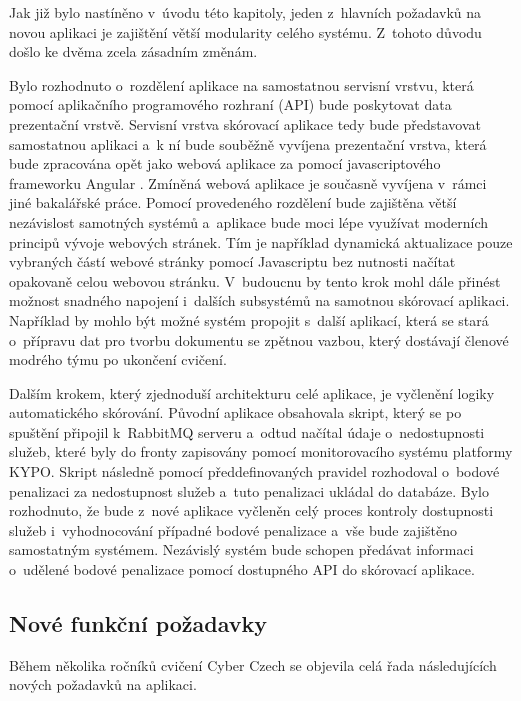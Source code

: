 \documentclass[
  digital,
  twoside,
  table, 
  nolof, 
  nolot
]{fithesis3}
\begin{document}
Jak již bylo nastíněno v~úvodu této kapitoly, jeden z~hlavních požadavků na novou aplikaci je zajištění větší modularity celého systému. Z~tohoto důvodu došlo ke dvěma zcela zásadním změnám.

Bylo rozhodnuto o~rozdělení aplikace na samostatnou servisní vrstvu, která pomocí aplikačního programového rozhraní (API) bude poskytovat data prezentační vrstvě. Servisní vrstva skórovací aplikace tedy bude představovat samostatnou aplikaci a~k ní bude souběžně vyvíjena prezentační vrstva, která bude zpracována opět jako webová aplikace za pomocí javascriptového frameworku Angular \cite{angular}. Zmíněná webová aplikace je současně vyvíjena v~rámci jiné bakalářské práce. Pomocí provedeného rozdělení bude zajištěna větší nezávislost samotných systémů a~aplikace bude moci lépe využívat moderních principů vývoje webových stránek. Tím je například dynamická aktualizace pouze vybraných částí webové stránky pomocí Javascriptu bez nutnosti načítat opakovaně celou webovou stránku. V~budoucnu by tento krok mohl dále přinést možnost  snadného napojení i~dalších subsystémů na samotnou skórovací aplikaci. Například by mohlo být možné systém propojit s~další aplikací, která se stará o~přípravu dat pro tvorbu dokumentu se zpětnou vazbou, který dostávají členové modrého týmu po ukončení cvičení.

Dalším krokem, který zjednoduší architekturu celé aplikace, je vyčlenění logiky automatického skórování. Původní aplikace obsahovala skript, který se po spuštění připojil k~RabbitMQ serveru a~odtud načítal údaje o~nedostupnosti služeb, které byly do fronty zapisovány pomocí monitorovacího systému platformy KYPO. Skript následně pomocí předdefinovaných pravidel rozhodoval o~bodové penalizaci za nedostupnost služeb a~tuto penalizaci ukládal do databáze. Bylo rozhodnuto, že bude z~nové aplikace vyčleněn celý proces kontroly dostupnosti služeb i~vyhodnocování případné bodové penalizace a~vše bude zajištěno samostatným systémem. Nezávislý systém bude schopen předávat informaci o~udělené bodové penalizace pomocí dostupného API do skórovací aplikace.

\subsection{Nové funkční požadavky}

Během několika ročníků cvičení Cyber Czech se objevila celá řada následujících nových požadavků na aplikaci.
\end{document}
